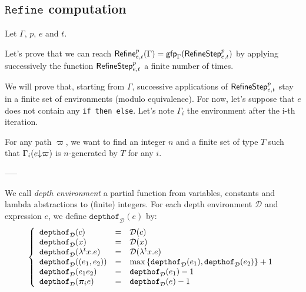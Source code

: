\documentclass[a4paper]{article}
\theoremstyle{definition}
\begin{document}
  \subsection{$\texttt{Refine}$ computation}

  Let $\Gamma$, $p$, $e$ and $t$.

    Let's prove that we can reach $\textsf{Refine}^{p}_{e,t}(\Gamma)=\textsf{gfp}_\Gamma (\textsf{RefineStep}^{p}_{e,t})$ by applying successively the function $\textsf{RefineStep}^{p}_{e,t}$ a finite number of times.

    We will prove that, starting from $\Gamma$, successive applications of $\textsf{RefineStep}^{p}_{e,t}$ stay in a finite set of environments (modulo equivalence).
    For now, let's suppose that $e$ does not contain any \texttt{if then else}. Let's note $\Gamma_i$ the environment after the i-th iteration.

    For any path $\varpi$, we want to find an integer $n$ and a finite set of type $T$ such that $\Gamma_i(e{\downarrow}\varpi)$
    is $n$-generated by $T$ for any $i$.

    -----

    \newcommand{\depth}[0]{\mathcal{D}}
    \newcommand{\pathdep}[2]{\texttt{path\_depth}_{#1}(#2)}
    \newcommand{\depof}[2]{\texttt{depthof}_{#1}(#2)}
    \newcommand{\rds}[1]{\texttt{RefineDepthStep}_{#1}}
    \newcommand{\rd}[2]{\texttt{RefineDepth}_{#1}(#2)}

    We call \textit{depth environment} a partial function from variables, constants and lambda abstractions
    to (finite) integers. For each depth environment $\depth$ and expression $e$, we define $\depof \depth e$ by:
    \[
      \left\{
        \begin{array}{lcl}
          \depof{\depth}{c} & = & \depth(c) \\
          \depof{\depth}{x} & = & \depth(x) \\
          \depof{\depth}{\lambda^tx.e} & = & \depth(\lambda^tx.e) \\
          \depof{\depth}{(e_1,e_2)} & = & \max {\{\depof{\depth}{e_1},\depof{\depth}{e_2}\}}+1 \\
          \depof{\depth}{e_1 e_2} & = & \depof{\depth}{e_1}-1 \\
          \depof{\depth}{\bpi_i e} & = & \depof{\depth}{e}-1
        \end{array}  
      \right.
    \]
\end{document}
